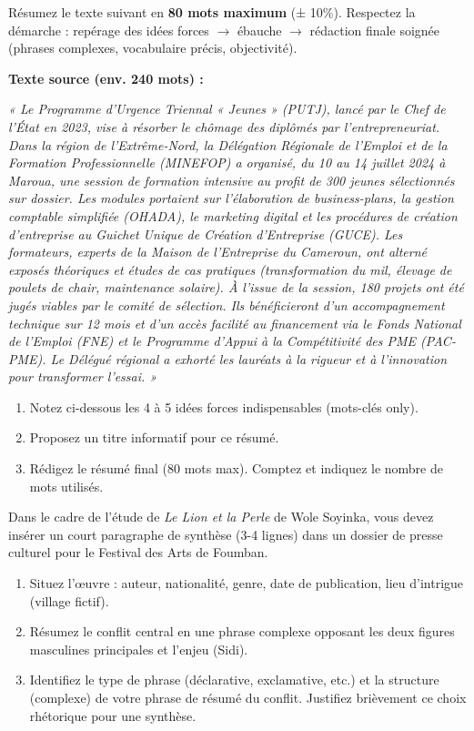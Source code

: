 \documentclass[11pt]{article}
\begin{document}
\begin{exercice}
Résumez le texte suivant en \textbf{80 mots maximum} (± 10\%). Respectez la démarche : repérage des idées forces $\rightarrow$ ébauche $\rightarrow$ rédaction finale soignée (phrases complexes, vocabulaire précis, objectivité).

\textbf{Texte source (env. 240 mots) :}

\textit{« Le Programme d'Urgence Triennal « Jeunes » (PUTJ), lancé par le Chef de l'État en 2023, vise à résorber le chômage des diplômés par l'entrepreneuriat. Dans la région de l'Extrême-Nord, la Délégation Régionale de l'Emploi et de la Formation Professionnelle (MINEFOP) a organisé, du 10 au 14 juillet 2024 à Maroua, une session de formation intensive au profit de 300 jeunes sélectionnés sur dossier. Les modules portaient sur l'élaboration de business-plans, la gestion comptable simplifiée (OHADA), le marketing digital et les procédures de création d'entreprise au Guichet Unique de Création d'Entreprise (GUCE). Les formateurs, experts de la Maison de l'Entreprise du Cameroun, ont alterné exposés théoriques et études de cas pratiques (transformation du mil, élevage de poulets de chair, maintenance solaire). À l'issue de la session, 180 projets ont été jugés viables par le comité de sélection. Ils bénéficieront d'un accompagnement technique sur 12 mois et d'un accès facilité au financement via le Fonds National de l'Emploi (FNE) et le Programme d'Appui à la Compétitivité des PME (PAC-PME). Le Délégué régional a exhorté les lauréats à la rigueur et à l'innovation pour transformer l'essai. »}

\begin{enumerate}
    \item Notez ci-dessous les 4 à 5 idées forces indispensables (mots-clés only).
    \item Proposez un titre informatif pour ce résumé.
    \item Rédigez le résumé final (80 mots max). Comptez et indiquez le nombre de mots utilisés.
\end{enumerate}
\end{exercice}

\begin{exercice}
Dans le cadre de l'étude de \textit{Le Lion et la Perle} de Wole Soyinka, vous devez insérer un court paragraphe de synthèse (3-4 lignes) dans un dossier de presse culturel pour le Festival des Arts de Foumban.

\begin{enumerate}
    \item Situez l'œuvre : auteur, nationalité, genre, date de publication, lieu d'intrigue (village fictif).
    \item Résumez le conflit central en une phrase complexe opposant les deux figures masculines principales et l'enjeu (Sidi).
    \item Identifiez le type de phrase (déclarative, exclamative, etc.) et la structure (complexe) de votre phrase de résumé du conflit. Justifiez brièvement ce choix rhétorique pour une synthèse.
\end{enumerate}
\end{exercice}
\end{document}
